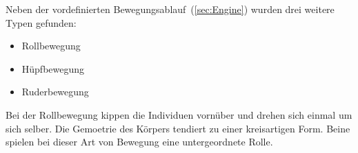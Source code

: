       Neben der vordefinierten Bewegungsablauf~(\vref{sec:Engine}) wurden drei weitere Typen gefunden:

      \begin{itemize}
        \item Rollbewegung
        \item Hüpfbewegung
        \item Ruderbewegung
      \end{itemize}

      Bei der Rollbewegung kippen die Individuen vornüber und drehen sich einmal um sich selber.
      Die Gemoetrie des Körpers tendiert zu einer kreisartigen Form.
      Beine spielen bei dieser Art von Bewegung eine untergeordnete Rolle.

      \begin{figure}[H]
        \centering


\end{figure}
